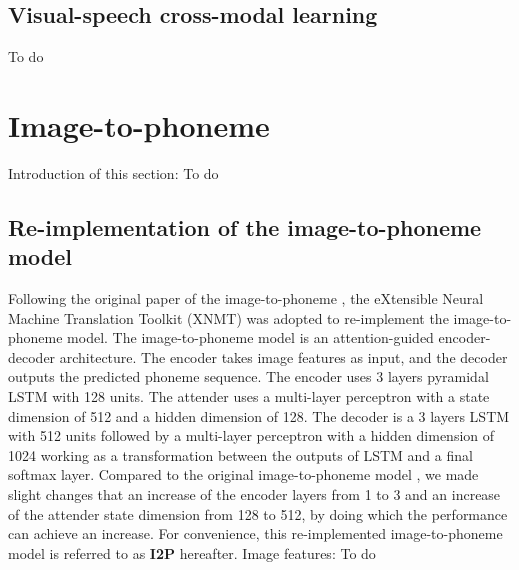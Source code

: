 \documentclass[journal,comsoc]{IEEEtran}
\begin{document}





\subsection{Visual-speech cross-modal learning}
To do

\section{Image-to-phoneme}
\label{sc:Image-to-phoneme}
Introduction of this section: To do
\subsection{Re-implementation of the image-to-phoneme model}
Following the original paper of the image-to-phoneme \cite{hasegawa2017image2speech}, the eXtensible Neural Machine Translation Toolkit (XNMT) \cite{neubig2018xnmt} was adopted to re-implement the image-to-phoneme model. The image-to-phoneme model is an attention-guided encoder-decoder architecture. The encoder takes image features as input, and the decoder outputs the predicted phoneme sequence. The encoder uses 3 layers pyramidal LSTM with 128 units. The attender uses a multi-layer perceptron with a state dimension of 512 and a hidden dimension of 128. The decoder is a 3 layers LSTM with 512 units followed by a multi-layer perceptron with a hidden dimension of 1024 working as a transformation between the outputs of LSTM and a final softmax layer. Compared to the original image-to-phoneme model \cite{hasegawa2017image2speech}, we made slight changes that an increase of the encoder layers from 1 to 3 and an increase of the attender state dimension from 128 to 512, by doing which the performance can achieve an increase. For convenience, this re-implemented image-to-phoneme model is referred to as \textbf{I2P} hereafter.  Image features: To do
\end{document}
